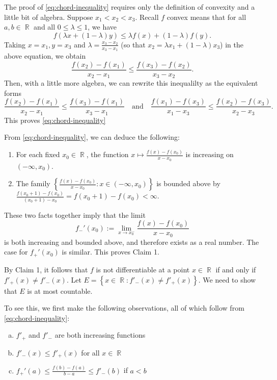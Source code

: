\documentclass[answers]{exam}
\DeclareMathOperator{\RR}{\mathbb{R}}
\begin{document}
\begin{questions}
\begin{solution}
The proof of \eqref{eq:chord-inequality} requires only the definition of convexity and a little bit of algebra.  Suppose $x_{1}<x_{2}<x_{3}$. Recall $f$ convex means that for all $a,b\in \RR$ and all $0\leq \lambda\leq 1$, we have
  \begin{equation*}
    f(\lambda x + (1-\lambda)y)\leq \lambda f(x) + (1-\lambda)f(y).
  \end{equation*}
  Taking $x=x_{1}, y=x_{3}$ and $\lambda=\frac{x_{3}-x_{2}}{x_{3}-x_{1}}$ (so that $x_{2}= \lambda x_{1} + (1-\lambda)x_{3}$) in the above equation, we obtain 
\begin{equation*}
  \frac{f(x_{2})-f(x_{1})}{x_{2}-x_{1}}\leq \frac{f(x_{3})-f(x_{2})}{x_{3}-x_{2}}.
\end{equation*}
Then, with a little more algebra, we can rewrite this inequalilty as the equivalent forms
\begin{equation*}
  \frac{f(x_{2})-f(x_{1})}{x_{2}-x_{1}}\leq \frac{f(x_{3})-f(x_{1})}{x_{3}-x_{1}} \quad \text{and}\quad \frac{f(x_{1})-f(x_{3})}{x_{1}-x_{3}}\leq \frac{f(x_{2})-f(x_{3})}{x_{2}-x_{3}}.
\end{equation*}
This proves \eqref{eq:chord-inequality}

From \eqref{eq:chord-inequality}, we can deduce the following:
\begin{enumerate}
\item For each fixed $x_{0}\in \RR$, the function $x\mapsto \frac{f(x)-f(x_{0})}{x-x_{0}}$ is increasing on $(-\infty,x_{0})$.
\item The family $\left\{   \frac{f(x)-f(x_{0})}{x-x_{0}}:  x\in (-\infty,x_{0})\right\}$ is bounded above by $\frac{f(x_{0}+1)-f(x_{0})}{(x_{0}+1)-x_{0}} = f(x_{0}+1)-f(x_{0})<\infty$.
\end{enumerate}
These two facts together imply that the limit
\begin{equation*}
  f_{-}'(x_{0}):=\lim_{x\to x_{0}^{-}}\frac{f(x)-f(x_{0})}{x-x_{0}}
\end{equation*}
is both increasing and bounded above, and therefore exists as a real number. The case for $f_{+}'(x_{0})$ is similar. This proves Claim 1.



By Claim 1, it follows that $f$ is not differentiable at a point $x\in \RR$ if and only if $f'_{+}(x)\neq f'_{-}(x)$. Let $E=\left\{ x\in \RR : f'_{-}(x)\neq f'_{+}(x) \right\}$. We need to show that $E$ is at most countable.


To see this, we first make the following observations, all of which follow from \eqref{eq:chord-inequality}:
\begin{enumerate}[(a)]
\item \label{item:3} $f'_{+}$ and $f'_{-}$ are both increasing functions
\item \label{item:5} $f'_{-}(x)\leq f'_{+}(x)$ for all $x\in\RR$
\item \label{item:4} $f_{+}'(a) \leq \frac{f(b)-f(a)}{b-a}\leq f'_{-}(b)$ if $a<b$
\end{enumerate}


\end{solution}
\end{questions}
\end{document}
